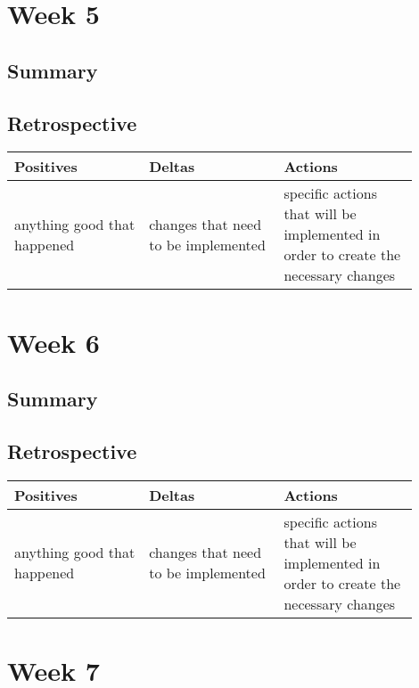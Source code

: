 \documentclass[letterpaper,10pt,serif,draftclsnofoot,onecolumn,compsoc,titlepage]{IEEEtran}
\begin{document}
\section{Week 5}

\subsection{Summary}


\subsection{Retrospective}


\begin{tabular}{|p{0.3\linewidth}|p{0.3\linewidth}|p{0.3\linewidth}|}
   \hline
   \textbf{Positives} & \textbf{Deltas} & \textbf{Actions}\\ 
   \hline
   anything good that happened & changes that need to be implemented & specific actions that will be implemented in order to create the necessary changes \\
   \hline
\end{tabular}

\section{Week 6}

\subsection{Summary}


\subsection{Retrospective}


\begin{tabular}{|p{0.3\linewidth}|p{0.3\linewidth}|p{0.3\linewidth}|}
   \hline
   \textbf{Positives} & \textbf{Deltas} & \textbf{Actions}\\ 
   \hline
   anything good that happened & changes that need to be implemented & specific actions that will be implemented in order to create the necessary changes \\
   \hline
\end{tabular}

\section{Week 7}
\end{document}
